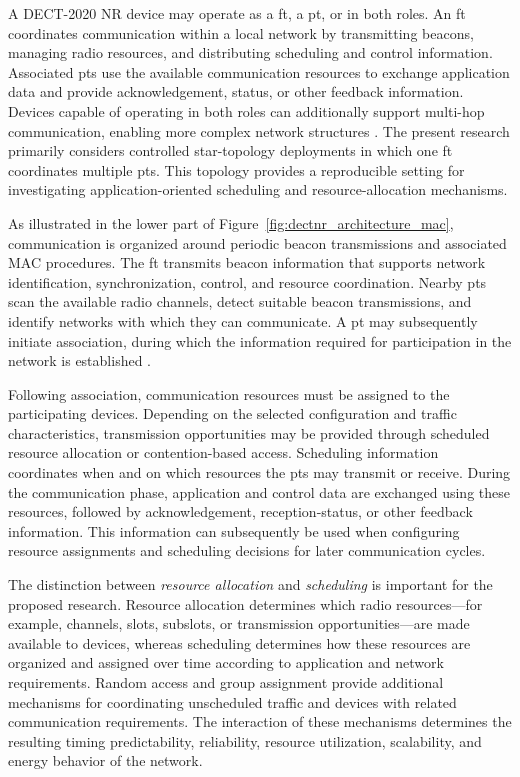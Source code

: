 \documentclass[12pt,a4paper]{article}
\begin{document}
A DECT-2020 NR device may operate as a \gls{ft}, a \gls{pt}, or in both roles. An \gls{ft} coordinates communication within a local network by transmitting beacons, managing radio resources, and distributing scheduling and control information. Associated \glspl{pt} use the available communication resources to exchange application data and provide acknowledgement, status, or other feedback information. Devices capable of operating in both roles can additionally support multi-hop communication, enabling more complex network structures \cite{etsi_ts103636_1,etsi_ts103636_4}. The present research primarily considers controlled star-topology deployments in which one \gls{ft} coordinates multiple \glspl{pt}. This topology provides a reproducible setting for investigating application-oriented scheduling and resource-allocation mechanisms.

As illustrated in the lower part of Figure~\ref{fig:dectnr_architecture_mac}, communication is organized around periodic beacon transmissions and associated MAC procedures. The \gls{ft} transmits beacon information that supports network identification, synchronization, control, and resource coordination. Nearby \glspl{pt} scan the available radio channels, detect suitable beacon transmissions, and identify networks with which they can communicate. A \gls{pt} may subsequently initiate association, during which the information required for participation in the network is established \cite{etsi_ts103636_4}.

Following association, communication resources must be assigned to the participating devices. Depending on the selected configuration and traffic characteristics, transmission opportunities may be provided through scheduled resource allocation or contention-based access. Scheduling information coordinates when and on which resources the \glspl{pt} may transmit or receive. During the communication phase, application and control data are exchanged using these resources, followed by acknowledgement, reception-status, or other feedback information. This information can subsequently be used when configuring resource assignments and scheduling decisions for later communication cycles.

The distinction between \textit{resource allocation} and \textit{scheduling} is important for the proposed research. Resource allocation determines which radio resources---for example, channels, slots, subslots, or transmission opportunities---are made available to devices, whereas scheduling determines how these resources are organized and assigned over time according to application and network requirements. Random access and group assignment provide additional mechanisms for coordinating unscheduled traffic and devices with related communication requirements. The interaction of these mechanisms determines the resulting timing predictability, reliability, resource utilization, scalability, and energy behavior of the network.
\end{document}
